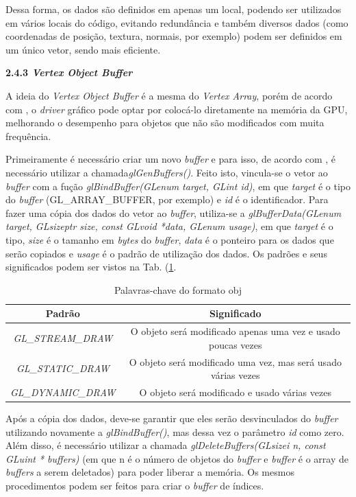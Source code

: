 \begin{description}
	Dessa forma, os dados são definidos em apenas um local, podendo ser utilizados em vários locais do código, evitando redundância e também diversos dados (como coordenadas de posição, textura, normais, por exemplo) podem ser definidos em um único vetor, sendo mais eficiente.     

	\item \textbf{2.4.3 \textit{Vertex Object Buffer}}	

	A ideia do \textit{Vertex Object Buffer} é a mesma do \textit{Vertex Array}, porém de acordo com \cite{vbo}, o \textit{driver} gráfico pode optar por colocá-lo diretamente na memória da GPU, melhorando o desempenho para objetos que não são modificados com muita frequência. 

	Primeiramente é necessário criar um novo \textit{buffer} e para isso, de acordo com \cite{interactive2012}, é necessário utilizar a chamada\textit{glGenBuffers()}. Feito isto, vincula-se o vetor ao \textit{buffer} com a fução \textit{glBindBuffer(GLenum  target, GLint id)}, em que \textit{target} é o tipo do \textit{buffer} (GL\_ARRAY\_BUFFER, por exemplo) e \textit{id} é o identificador. Para fazer uma cópia dos dados do vetor ao \textit{buffer}, utiliza-se a \textit{glBufferData(GLenum target, GLsizeptr size, const GLvoid *data, GLenum usage)}, em que \textit{target} é o tipo, \textit{size} é o tamanho em \textit{bytes} do \textit{buffer}, \textit{data} é o ponteiro para os dados que serão copiados e \textit{usage} é o padrão de utilização dos dados. Os padrões e seus significados podem ser vistos na Tab. (\ref{bufferdata}.

\begin{table}[h]
	\centering	
	\begin{tabular}{cc}
		\toprule
		\textbf{Padrão} & \textbf{Significado}  \\
		\midrule
		\textit{GL\_STREAM\_DRAW} &  O objeto será modificado apenas uma vez e usado poucas vezes  \\
		\textit{GL\_STATIC\_DRAW} & O objeto será modificado uma vez, mas será usado várias vezes \\
		\textit{GL\_DYNAMIC\_DRAW} &  O objeto será modificado e usado várias vezes \\
		\bottomrule
	\end{tabular}
	\caption{ Palavras-chave do formato obj}
	\label{bufferdata}
\end{table}

	Após a cópia dos dados, deve-se garantir que eles serão desvinculados do \textit{buffer} utilizando novamente a \textit{glBindBuffer()}, mas dessa vez o parâmetro \textit{id} como zero. Além disso, é necessário utilizar a chamada \textit{glDeleteBuffers(GLsizei n, const GLuint * buffers)} (em que n é o número de objetos do \textit{buffer} e \textit{buffer} é o array de \textit{buffers} a serem deletados) para poder liberar a memória. Os mesmos procedimentos podem ser feitos para criar o \textit{buffer} de índices. 
  


\end{description}
